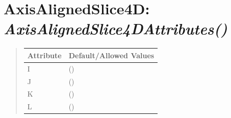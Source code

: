 \documentclass[letterpaper,10pt,english]{sphinxmanual}
\begin{document}
\begin{DUlineblock}{0em}
\item[] 
\end{DUlineblock}

\begin{DUlineblock}{0em}
\item[] 
\end{DUlineblock}


\section{\textbf{AxisAlignedSlice4D}: \emph{AxisAlignedSlice4DAttributes()}}
\label{attributes:axisalignedslice4d-axisalignedslice4dattributes}
\begin{DUlineblock}{0em}
\item[] 
\end{DUlineblock}
\begin{quote}

\begin{tabulary}{\linewidth}{|L|L|}
\hline

\textbf{Attribute}
 & 
\textbf{Default/Allowed Values}
\\
\hline
I
 & 
()
\\
\hline
J
 & 
()
\\
\hline
K
 & 
()
\\
\hline
L
 & 
()
\\
\hline\end{tabulary}

\end{quote}

\begin{DUlineblock}{0em}
\item[] 
\end{DUlineblock}

\begin{DUlineblock}{0em}
\item[] 
\end{DUlineblock}
\end{document}

